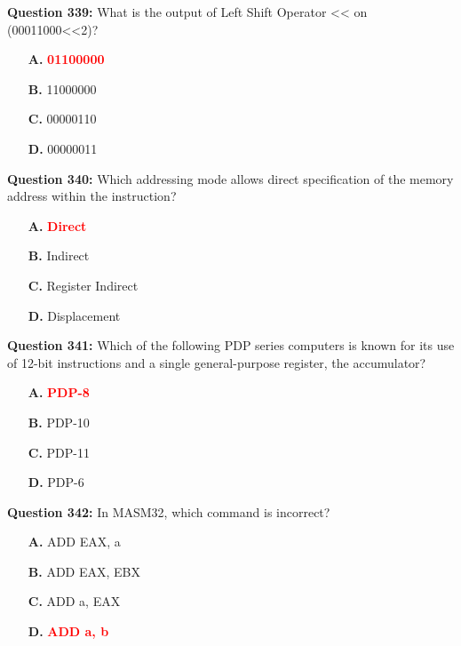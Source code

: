 \documentclass[12pt,a4paper]{article}
\begin{document}
\vspace{0.5cm}

\textbf{Question 339:} What is the output of Left Shift Operator << on (00011000<<2)?

\begin{itemize}
    \item[\textbf{A.}] \textcolor{red}{\textbf{01100000}}
    \item[\textbf{B.}] 11000000
    \item[\textbf{C.}] 00000110
    \item[\textbf{D.}] 00000011
\end{itemize}

\vspace{0.5cm}

\textbf{Question 340:} Which addressing mode allows direct specification of the memory address within the instruction?

\begin{itemize}
    \item[\textbf{A.}] \textcolor{red}{\textbf{Direct}}
    \item[\textbf{B.}] Indirect
    \item[\textbf{C.}] Register Indirect
    \item[\textbf{D.}] Displacement
\end{itemize}

\vspace{0.5cm}

\textbf{Question 341:} Which of the following PDP series computers is known for its use of 12-bit instructions and a single general-purpose register, the accumulator?

\begin{itemize}
    \item[\textbf{A.}] \textcolor{red}{\textbf{PDP-8}}
    \item[\textbf{B.}] PDP-10
    \item[\textbf{C.}] PDP-11
    \item[\textbf{D.}] PDP-6
\end{itemize}

\vspace{0.5cm}

\textbf{Question 342:} In MASM32, which command is incorrect?

\begin{itemize}
    \item[\textbf{A.}] ADD EAX, a
    \item[\textbf{B.}] ADD EAX, EBX
    \item[\textbf{C.}] ADD a, EAX
    \item[\textbf{D.}] \textcolor{red}{\textbf{ADD a, b}}
\end{itemize}
\end{document}
